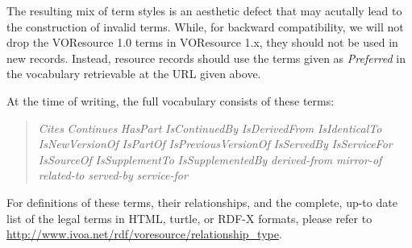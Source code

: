 \documentclass[11pt,a4paper]{ivoa}
\begin{document}
The resulting mix of term styles is an aesthetic defect that may
acutally lead to the construction of invalid terms.  While, for backward
compatibility, we will not drop the VOResource 1.0 terms in
VOResource 1.x, they should not be used in new records.  Instead,
resource records should use the terms given as \emph{Preferred} in the
vocabulary retrievable at the URL given above.

At the time of writing, the full vocabulary consists of these terms:

\begin{quotation}\noindent
\textsl{Cites}
\textsl{Continues}
\textsl{HasPart}
\textsl{IsContinuedBy}
\textsl{IsDerivedFrom}
\textsl{IsIdenticalTo}
\textsl{IsNewVersionOf}
\textsl{IsPartOf}
\textsl{IsPreviousVersionOf}
\textsl{IsServedBy}
\textsl{IsServiceFor}
\textsl{IsSourceOf}
\textsl{IsSupplementTo}
\textsl{IsSupplementedBy}
\textsl{derived-from}
\textsl{mirror-of}
\textsl{related-to}
\textsl{served-by}
\textsl{service-for}

\end{quotation}

For definitions of these terms, their relationships, and the complete,
up-to date list of the legal terms in HTML, turtle, or RDF-X formats,
please refer to \url{http://www.ivoa.net/rdf/voresource/relationship_type}.
\end{document}
